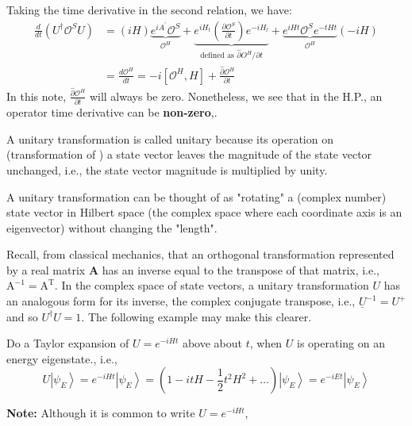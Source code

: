 Taking the time derivative in the second relation, we have:
\begin{equation}
\begin{aligned}
\frac{d}{d t}\left(U^{\dagger} \mathcal{O}^{S} U\right) &=(i H) \underbrace{e^{i A^{\prime}} \mathcal{O}^{S}}_{\mathcal{O}^{H}}+\underbrace{e^{i H_{t}}\left(\frac{\partial \mathcal{O}^{S}}{\partial t}\right) e^{-i H_{l}}}_{\text {defined as } \hat{\partial} O^{H} / \partial t}+\underbrace{e^{i H t} \mathcal{O}^{S} e^{-t H t}}_{\mathcal{O}^{H}}(-i H) \\
&=\frac{d \mathcal{O}^{H}}{d t}=-i\left[\mathcal{O}^{H}, H\right]+\frac{\hat{\partial} \mathcal{O}^{H}}{\partial t}
\end{aligned}
\end{equation}
In this note, $\frac{\hat{\partial} \mathcal{O}^{H}}{\partial t}$ will always be zero. Nonetheless, we see that in the H.P., an operator time derivative can be \textbf{non-zero},.
\begin{mybox}
A unitary transformation is called unitary because its operation on (transformation of ) a state vector leaves the magnitude of the state vector unchanged, i.e., the state vector magnitude is multiplied by unity.

A unitary transformation can be thought of as "rotating" a (complex number) state vector in Hilbert space (the complex space where each coordinate axis is an eigenvector) without changing the "length".

Recall, from classical mechanics, that an orthogonal transformation represented by a real matrix $\mathbf{A}$ has an inverse equal to the transpose of that matrix, i.e., $\mathrm{A}^{-1}=\mathrm{A}^{\mathrm{T}}$. In the complex space of state vectors, a unitary transformation $U$ has an analogous form for its inverse, the complex conjugate transpose, i.e., $\underline{U}^{-1}=U^{+}$ and so $U^{\dagger} U=1 .$ The following example may make this clearer.

Do a Taylor expansion of $U=e^{-i H t}$ above about $t$, when $U$ is operating on an energy eigenstate., i.e.,
\begin{equation}
U\left|\psi_{E}\right\rangle= e^{-iHt}\left|\psi_{E}\right\rangle=\left(1-i t H-\frac{1}{2} t^{2} H^{2}+\ldots\right)\left|\psi_{E}\right\rangle= e^{-i E t}\left|\psi_{E}\right\rangle
\end{equation}
\end{mybox}
\textbf{Note:} Although it is common to write $U=e^{-iHt}$,

